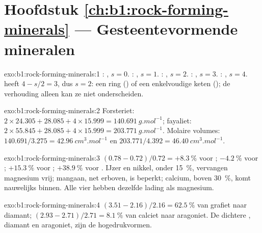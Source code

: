 \section*{Hoofdstuk \ref{ch:b1:rock-forming-minerals} --- Gesteentevormende mineralen}

\begin{solution}{exo:b1:rock-forming-minerals:1}
: , $s = 0$. : ,
$s = 1$. : , $s = 2$. :
, $s = 3$. : , $s = 4$. 
heeft $4 - s/2 = 3$, dus $s = 2$: een ring () of een enkelvoudige keten
(); de verhouding alleen kan ze niet onderscheiden.
\end{solution}

\begin{solution}{exo:b1:rock-forming-minerals:2}
Forsteriet: $2\times24.305 + 28.085 + 4\times15.999 =
\qty{140.691}{g.mol^{-1}}$; fayaliet: $2\times55.845 + 28.085 +
4\times15.999 = \qty{203.771}{g.mol^{-1}}$. Molaire volumes:
$140.691/3.275 = \qty{42.96}{cm^3.mol^{-1}}$ en $203.771/4.392 =
\qty{46.40}{cm^3.mol^{-1}}$.
\end{solution}

\begin{solution}{exo:b1:rock-forming-minerals:3}
$(0.78 - 0.72)/0.72 = +\qty{8.3}{\percent}$ voor ;
$-\qty{4.2}{\percent}$ voor ; $+\qty{15.3}{\percent}$ voor
; $+\qty{38.9}{\percent}$ voor . IJzer en nikkel,
onder \qty{15}{\percent}, vervangen magnesium vrij; mangaan, net erboven, is
beperkt; calcium, boven \qty{30}{\percent}, komt nauwelijks binnen. Alle vier hebben
dezelfde lading als magnesium.
\end{solution}

\begin{solution}{exo:b1:rock-forming-minerals:4}
$(3.51 - 2.16)/2.16 = \qty{62.5}{\percent}$ van grafiet naar diamant;
$(2.93 - 2.71)/2.71 = \qty{8.1}{\percent}$ van calciet naar aragoniet. De
dichtere , diamant en aragoniet, zijn de hogedrukvormen.
\end{solution}

